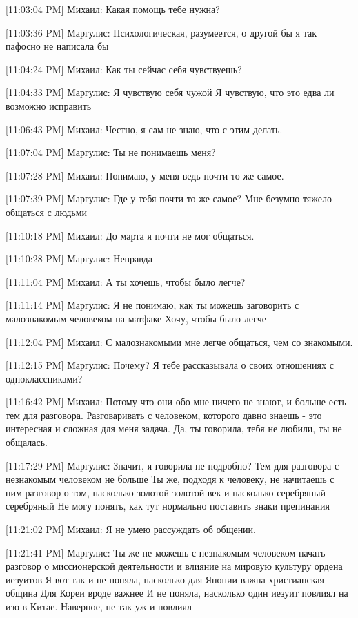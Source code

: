 \documentclass{article}
\begin{document}
[11:03:04 PM] Михаил:
Какая помощь тебе нужна?

[11:03:36 PM] Маргулис:
Психологическая, разумеется, о другой бы я так пафосно не написала бы

[11:04:24 PM] Михаил:
Как ты сейчас себя чувствуешь?

[11:04:33 PM] Маргулис:
Я чувствую себя чужой
 Я чувствую, что это едва ли возможно исправить

[11:06:43 PM] Михаил:
Честно, я сам не знаю, что с этим делать.

[11:07:04 PM] Маргулис:
Ты не понимаешь меня?

[11:07:28 PM] Михаил:
Понимаю, у меня ведь почти то же самое.

[11:07:39 PM] Маргулис:
Где у тебя почти то же самое?
 Мне безумно тяжело общаться с людьми

[11:10:18 PM] Михаил:
До марта я почти не мог общаться.

[11:10:28 PM] Маргулис:
Неправда

[11:11:04 PM] Михаил:
А ты хочешь, чтобы было легче?

[11:11:14 PM] Маргулис:
Я не понимаю, как ты можешь заговорить с малознакомым человеком на матфаке
 Хочу, чтобы было легче

[11:12:04 PM] Михаил:
С малознакомыми мне легче общаться, чем со знакомыми.

[11:12:15 PM] Маргулис:
Почему?
 Я тебе рассказывала о своих отношениях с одноклассниками?

[11:16:42 PM] Михаил:
Потому что они обо мне ничего не знают, и больше есть тем для разговора. Разговаривать с человеком, которого давно знаешь - это интересная и сложная для меня задача. Да, ты говорила, тебя не любили, ты не общалась.

[11:17:29 PM] Маргулис:
Значит, я говорила не подробно?
 Тем для разговора с незнакомым человеком не больше
 Ты же, подходя к человеку, не начитаешь с ним разговор о том, насколько золотой золотой век и насколько серебряный—серебряный
 Не могу понять, как тут нормально поставить знаки препинания

[11:21:02 PM] Михаил:
Я не умею рассуждать об общении.

[11:21:41 PM] Маргулис:
Ты же не можешь с незнакомым человеком начать разговор о миссионерской деятельности и влияние на мировую культуру ордена иезуитов
 Я вот так и не поняла, насколько для Японии важна христианская община 
Для Кореи вроде важнее 
И не поняла, насколько один иезуит повлиял на изо в Китае. Наверное, не так уж и повлиял
\end{document}
